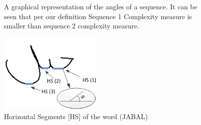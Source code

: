 \documentclass[journal,compsoc]{IEEEtran}
\begin{document}
\begin{figure}[h]
     \begin{center}
    \end{center}
    \caption{A graphical representation of the angles of a sequence. It can be seen that per our definition Sequence 1 Complexity measure is smaller than sequence 2 complexity measure.}
   \label{fig:sequence_complexity}
\end{figure}


\begin{figure}
\centering
\includegraphics[width=5cm]{./figures/horizontal_segments}
\caption{Horizontal Segments [HS] of the word (JABAL)}
\label{fig:horizontal_segments}
\end{figure}
\end{document}
